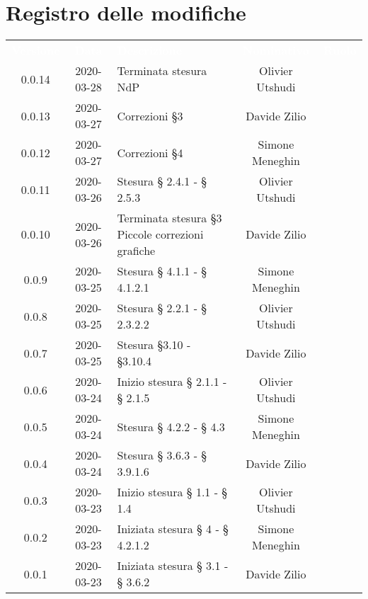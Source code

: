 \section*{Registro delle modifiche}
{
	\centering
	\begin{longtable}{ c c  C{4cm}  c  c }
		\textcolor{white}{\textbf{Versione}} & \textcolor{white}{\textbf{Data}} & \textcolor{white}{\textbf{Descrizione}} & \textcolor{white}{\textbf{Nominativo}} & \textcolor{white}{\textbf{Ruolo}}\\
		0.0.14 & 2020-03-28 & Terminata stesura NdP & Olivier Utshudi &\adm{} \\
		0.0.13 & 2020-03-27 & Correzioni \S 3 & Davide Zilio &\adm{}\\
		0.0.12 & 2020-03-27 & Correzioni \S 4 & Simone Meneghin &\adm{}\\
		0.0.11 & 2020-03-26 & Stesura § 2.4.1 - § 2.5.3 & Olivier Utshudi &\adm{}\\
		0.0.10 & 2020-03-26 & Terminata stesura \S 3 \newline Piccole correzioni grafiche & Davide Zilio &\adm{}\\
		0.0.9 & 2020-03-25 & Stesura § 4.1.1 - § 4.1.2.1 & Simone Meneghin &\adm{}\\	
		
		0.0.8 & 2020-03-25 & Stesura § 2.2.1 - § 2.3.2.2 & Olivier Utshudi &\adm{}\\
		
		0.0.7 & 2020-03-25 & Stesura \S 3.10 - \S 3.10.4 & Davide Zilio & \adm{}\\
		
		0.0.6 & 2020-03-24 & Inizio stesura § 2.1.1 - § 2.1.5 & Olivier Utshudi &\adm{}\\

		0.0.5 & 2020-03-24 & Stesura § 4.2.2 - § 4.3 & Simone Meneghin &\adm{}\\		
		
		0.0.4 & 2020-03-24 & Stesura § 3.6.3 - § 3.9.1.6 & Davide Zilio &\adm{}\\
		
		0.0.3 & 2020-03-23 & Inizio stesura § 1.1 - § 1.4 & Olivier Utshudi &\adm{}\\
		
		0.0.2 & 2020-03-23 & Iniziata stesura § 4 - § 4.2.1.2 & Simone Meneghin &\adm{}\\
		
		0.0.1 & 2020-03-23 & Iniziata stesura § 3.1 - § 3.6.2 & Davide Zilio &\adm{}\\		
		
	\end{longtable}

}